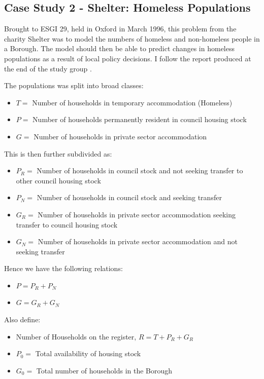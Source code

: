 \documentclass[11pt]{article} %
\begin{document}
	
	
	\subsection{Case Study 2 - Shelter: Homeless Populations \label{homeless}}
	

   Brought to ESGI 29, held in Oxford in March 1996, this problem from the charity Shelter  was to model the numbers of homeless and non-homeless people in a Borough. The model should then be able to predict changes in homeless populations as a result of local policy decisions. I follow the report produced at the end of the study group \cite{Shelter1996}.
	
	The populations was split into broad classes: 
	\begin{itemize}
		\item $ T= $ Number of households in temporary accommodation (Homeless)
		\item $  P= $ Number of households permanently resident in council housing stock
		\item $ G= $ Number of households in private sector accommodation 
	\end{itemize}
	This is then further subdivided as:
	\begin{itemize}
		\item $ P_R= $ Number of households in council stock and not  seeking transfer to other council housing stock 
		\item $ P_N= $ Number of households in council stock and seeking transfer 
		\item $ G_R= $ Number of households in private sector accommodation seeking transfer to council housing stock 
		\item $ G_N= $ Number of households in private sector accommodation and not seeking transfer
	\end{itemize}

Hence we have the following relations:
\begin{itemize}
	\item $ P=P_R+P_N $
	\item $ G=G_R+G_N $
	
\end{itemize}

Also define: 
\begin{itemize}
	\item Number of Households on the register,  $  R=T+P_R+G_R $
	\item $ P_0 = $ Total availability of housing stock 
	\item $ G_0= $ Total number of households in the Borough
\end{itemize}
\end{document}
